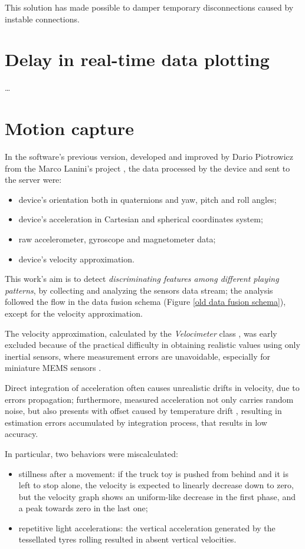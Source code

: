 This solution has made possible to damper temporary disconnections caused by instable connections.

\section{Delay in real-time data plotting}
\dots

\section{Motion capture}
In the software's previous version, developed and improved by Dario Piotrowicz \cite{Pio19} from the Marco Lanini's project \cite{Lan17}, the data processed by the device and sent to the server were:
\begin{itemize}
	\item device's orientation both in quaternions and yaw, pitch and roll angles;
	\item device's acceleration in Cartesian and spherical coordinates system;
	\item raw accelerometer, gyroscope and magnetometer data;
	\item device's velocity approximation.
\end{itemize}

This work's aim is to detect \textit{discriminating features among different playing patterns}, by collecting and analyzing the sensors data stream; the analysis followed the flow in the data fusion schema (Figure \ref{old data fusion schema}), except for the velocity approximation.
\bigbreak

The velocity approximation, calculated by the \textit{Velocimeter} class \cite{Pio19}, was early excluded because of the practical difficulty in obtaining realistic values using only inertial sensors, where measurement errors are unavoidable, especially for miniature MEMS sensors \cite{Du15, Est14, Kow15, Liu01, Sei07, UsingAcc, Woo07, Yan06}.

Direct integration of acceleration often causes unrealistic drifts in velocity, due to errors propagation; furthermore, measured acceleration not only carries random noise, but also presents with offset caused by temperature drift \cite{Kow15, Liu01, Woo07}, resulting in estimation errors accumulated by integration process, that results in low accuracy.

In particular, two behaviors were miscalculated:
\begin{itemize}
	\item stillness after a movement: if the truck toy is pushed from behind and it is left to stop alone, the velocity is expected to linearly decrease down to zero, but the velocity graph shows an uniform-like decrease in the first phase, and a peak towards zero in the last one;
	\item repetitive light accelerations: the vertical acceleration generated by the tessellated tyres rolling resulted in absent vertical velocities.
\end{itemize}

